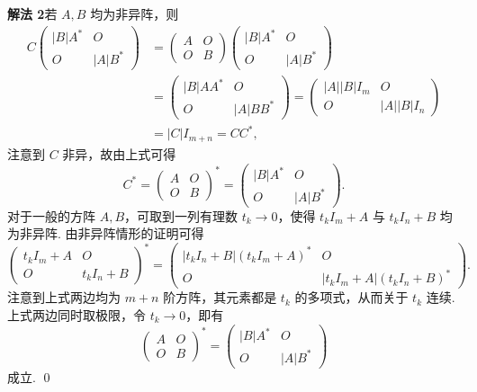 \documentclass[UTF8,12pt,a4paper,fontset=fandol]{ctexart}
\begin{document}
\noindent\textbf{解法 2}\quad 若 $A,B$ 均为非异阵，则
\[
\begin{aligned}
C
\left(
\begin{array}{cc}
|B|A^* & O\\
O & |A|B^*
\end{array}
\right)
&=
\left(
\begin{array}{cc}
A & O\\
O & B
\end{array}
\right)
\left(
\begin{array}{cc}
|B|A^* & O\\
O & |A|B^*
\end{array}
\right)\\
&=
\left(
\begin{array}{cc}
|B|AA^* & O\\
O & |A|BB^*
\end{array}
\right)
=
\left(
\begin{array}{cc}
|A||B|I_m & O\\
O & |A||B|I_n
\end{array}
\right)\\
&=|C|I_{m+n}=CC^*,
\end{aligned}
\]
注意到 $C$ 非异，故由上式可得
\[
C^*=
\left(
\begin{array}{cc}
A & O\\
O & B
\end{array}
\right)^*
=
\left(
\begin{array}{cc}
|B|A^* & O\\
O & |A|B^*
\end{array}
\right).
\]
对于一般的方阵 $A,B$，可取到一列有理数 $t_k\to0$，使得 $t_kI_m+A$ 与 $t_kI_n+B$ 均为非异阵. 由非异阵情形的证明可得
\[
\left(
\begin{array}{cc}
t_kI_m+A & O\\
O & t_kI_n+B
\end{array}
\right)^*
=
\left(
\begin{array}{cc}
|t_kI_n+B|(t_kI_m+A)^* & O\\
O & |t_kI_m+A|(t_kI_n+B)^*
\end{array}
\right).
\]
注意到上式两边均为 $m+n$ 阶方阵，其元素都是 $t_k$ 的多项式，从而关于 $t_k$ 连续. 上式两边同时取极限，令 $t_k\to0$，即有
\[
\left(
\begin{array}{cc}
A & O\\
O & B
\end{array}
\right)^*
=
\left(
\begin{array}{cc}
|B|A^* & O\\
O & |A|B^*
\end{array}
\right)
\]
成立. \qed
\end{document}
